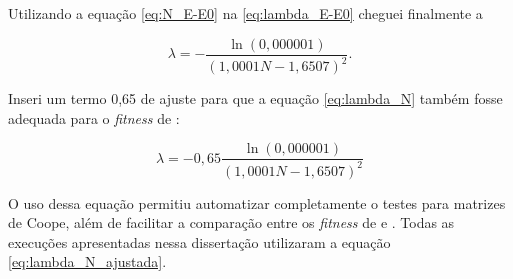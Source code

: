 	Utilizando a equação \ref{eq:N_E-E0} na \ref{eq:lambda_E-E0} cheguei finalmente a
	
	\begin{equation}\label{eq:lambda_N}
		\lambda = - \frac{\ln(0,000001)}{(1,0001N - 1,6507)^2}.
	\end{equation}
		
	
	Inseri um termo 0,65 de ajuste para que a equação \ref{eq:lambda_N} também fosse adequada para o \emph{fitness} de \cite{metodo2004}:
	
	\begin{equation}\label{eq:lambda_N_ajustada}
		\lambda = - 0,65 \frac{\ln(0,000001)}{(1,0001N - 1,6507)^2}
	\end{equation}
	
	O uso dessa equação permitiu automatizar completamente o testes para matrizes de Coope, além de facilitar a comparação entre os \emph{fitness} de \cite{metodo2004} e \cite{metodo2011}. Todas as execuções apresentadas nessa dissertação utilizaram a equação \ref{eq:lambda_N_ajustada}.
	
